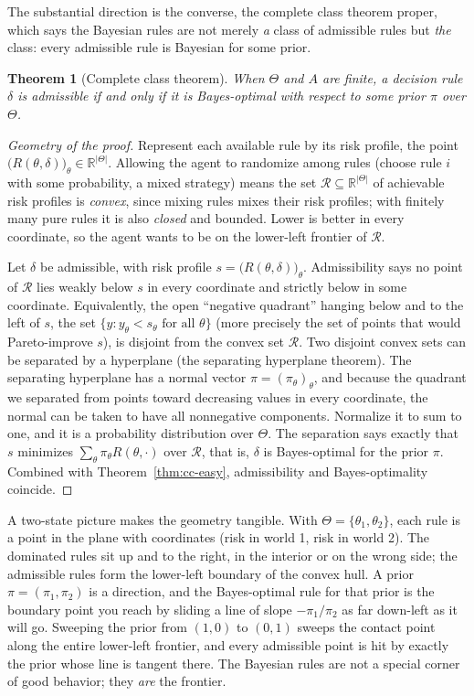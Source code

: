 \documentclass[10pt]{article}
\newtheorem{theorem}{Theorem}[section]
\theoremstyle{definition}
\theoremstyle{remark}
\newcommand{\R}{\mathbb{R}}
\begin{document}
The substantial direction is the converse, the complete class theorem proper, which says the Bayesian rules are not merely \emph{a} class of admissible rules but \emph{the} class: every admissible rule is Bayesian for some prior.

\begin{theorem}[Complete class theorem]
\label{thm:cc}
When $\Theta$ and $A$ are finite, a decision rule $\delta$ is admissible if and only if it is Bayes-optimal with respect to some prior $\pi$ over $\Theta$.
\end{theorem}

\begin{proof}[Geometry of the proof]
Represent each available rule by its risk profile, the point $\big(R(\theta, \delta)\big)_{\theta} \in \R^{|\Theta|}$. Allowing the agent to randomize among rules (choose rule $i$ with some probability, a mixed strategy) means the set $\mathcal{R} \subseteq \R^{|\Theta|}$ of achievable risk profiles is \emph{convex}, since mixing rules mixes their risk profiles; with finitely many pure rules it is also \emph{closed} and bounded. Lower is better in every coordinate, so the agent wants to be on the lower-left frontier of $\mathcal{R}$.

Let $\delta$ be admissible, with risk profile $s = \big(R(\theta, \delta)\big)_\theta$. Admissibility says no point of $\mathcal{R}$ lies weakly below $s$ in every coordinate and strictly below in some coordinate. Equivalently, the open ``negative quadrant'' hanging below and to the left of $s$, the set $\{ y : y_\theta < s_\theta \text{ for all } \theta \}$ (more precisely the set of points that would Pareto-improve $s$), is disjoint from the convex set $\mathcal{R}$. Two disjoint convex sets can be separated by a hyperplane (the separating hyperplane theorem). The separating hyperplane has a normal vector $\pi = (\pi_\theta)_\theta$, and because the quadrant we separated from points toward decreasing values in every coordinate, the normal can be taken to have all nonnegative components. Normalize it to sum to one, and it is a probability distribution over $\Theta$. The separation says exactly that $s$ minimizes $\sum_\theta \pi_\theta R(\theta, \cdot)$ over $\mathcal{R}$, that is, $\delta$ is Bayes-optimal for the prior $\pi$. Combined with Theorem~\ref{thm:cc-easy}, admissibility and Bayes-optimality coincide.
\end{proof}

A two-state picture makes the geometry tangible. With $\Theta = \{\theta_1, \theta_2\}$, each rule is a point in the plane with coordinates (risk in world 1, risk in world 2). The dominated rules sit up and to the right, in the interior or on the wrong side; the admissible rules form the lower-left boundary of the convex hull. A prior $\pi = (\pi_1, \pi_2)$ is a direction, and the Bayes-optimal rule for that prior is the boundary point you reach by sliding a line of slope $-\pi_1/\pi_2$ as far down-left as it will go. Sweeping the prior from $(1,0)$ to $(0,1)$ sweeps the contact point along the entire lower-left frontier, and every admissible point is hit by exactly the prior whose line is tangent there. The Bayesian rules are not a special corner of good behavior; they \emph{are} the frontier.
\end{document}
